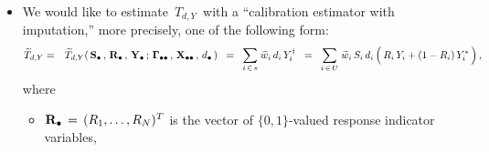 \begin{itemize}
    in other words, the measurement of \,$Y_{k}$\, somehow failed for each unit \,$k$\,
    in the ``nonresponding'' subsample
    \,$s_{M} \, := \,s \,\backslash\, s_{R} \,\subset\, U$.\,
\item
    We would like to estimate \,$T_{d,Y}$\,
    with a ``calibration estimator with imputation,''
    more precisely, one of the following form:
    \begin{eqnarray*}
    \widetilde{T}_{d,Y}
    & = &
        \widetilde{T}_{d,Y}(\,
            \Sdot\,,\,
            \Rdot\,,\,
            \Ydot\,;\,
            \Gdotdot\,,\,
            \Xdotdot\,,\,
            \dbullet
            \,)
    \;\; = \;\;
        \underset{i\,\in\,s}{\sum}\;\widetilde{w}_{i}\,d_{i}\,Y^{\dagger}_{i}
    \;\; = \;\;
        \underset{i\,\in\,U}{\sum}\;\widetilde{w}_{i}\,S_{i}\,d_{i}\left(\,
            R_{i}\,Y_{i}
            \overset{{\color{white}.}}{+}
            (1-R_{i})\,Y^{*}_{i}
            \,\right),
    \end{eqnarray*}
    where
    \begin{itemize}
    \item
        $\mathbf{R}_{\bullet} \,=\, (R_{1},\ldots,R_{N})^{T}$ is the vector of $\{0,1\}$-valued response indicator variables,

\end{itemize}
\end{itemize}
